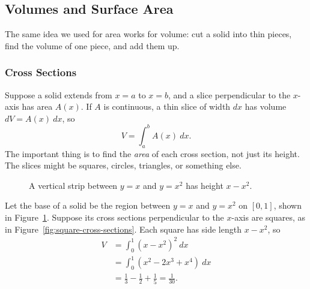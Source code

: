 \subsection{Volumes and Surface Area}

The same idea we used for area works for volume: cut a solid into thin
pieces, find the volume of one piece, and add them up.

\subsubsection{Cross Sections}

Suppose a solid extends from $x=a$ to $x=b$, and a slice perpendicular to
the $x$-axis has area $A(x)$. If $A$ is continuous, a thin slice of width
$dx$ has volume $dV=A(x)\ dx$, so
$$V=\int_a^b A(x)\ dx.$$
The important thing is to find the \textit{area} of each cross section,
not just its height. The slices might be squares, circles, triangles,
or something else.

\begin{figure}[H]
\centering
{}
\caption{A vertical strip between $y=x$ and $y=x^2$ has height $x-x^2$.}
\label{fig:volume-base}
\end{figure}

\begin{exampleblock}
Let the base of a solid be the region between $y=x$ and $y=x^2$ on
$[0,1]$, shown in Figure~\ref{fig:volume-base}. Suppose its cross sections
perpendicular to the $x$-axis are squares, as in
Figure~\ref{fig:square-cross-sections}. Each square has side length
$x-x^2$, so
$$\begin{aligned}
V&=\int_0^1(x-x^2)^2\ dx\\
 &=\int_0^1(x^2-2x^3+x^4)\ dx\\
 &=\frac13-\frac12+\frac15=\frac1{30}.
\end{aligned}$$
\end{exampleblock}

